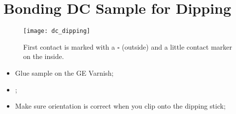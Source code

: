 \newpage
\section{Bonding DC Sample for Dipping}
\label{sec:bonding-dc-sample}


\begin{figure}[h]
  \centering \texttt{[image: dc\_dipping]}
  \caption{\small First contact is  marked with a $ \square $ (outside) and  a little contact marker
    on the inside.\label{fig:dc_dipping}}
\end{figure}

\begin{itemize}
\item Glue sample on the GE Varnish;
\item {}\ec;
\item Make sure orientation is correct when you clip onto the dipping stick;
\end{itemize}
